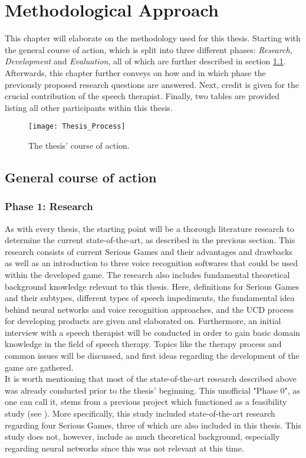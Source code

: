 \documentclass[draft,final]{vutinfth} %
\begin{document}
\chapter{Methodological Approach}
This chapter will elaborate on the methodology used for this thesis. Starting with the general course of action, which is split into three different phases: \emph{Research, Development} and \emph{Evaluation}, all of which are further described in section \ref{chap:coa}. Afterwards, this chapter further conveys on how and in which phase the previously proposed research questions are answered. Next, credit is given for the crucial contribution of the speech therapist. Finally, two tables are provided listing all other participants within this thesis.
\label{chap:methodoloy}
\begin{figure}
\begin{center}
\texttt{[image: Thesis\_Process]}
\end{center}
\caption{The thesis' course of action.}
\end{figure}

\section{General course of action}
\label{chap:coa}
\subsection{Phase 1: Research}
As with every thesis, the starting point will be a thorough literature research to determine the current state-of-the-art, as described in the previous section. This research consists of current Serious Games and their advantages and drawbacks as well as an introduction to three voice recognition softwares that could be used within the developed game. The research also includes fundamental theoretical background knowledge relevant to this thesis. Here, definitions for Serious Games and their subtypes, different types of speech impediments, the fundamental idea behind neural networks and voice recognition approaches, and the UCD process for developing products are given and elaborated on. Furthermore, an initial interview with a speech therapist will be conducted in order to gain basic domain knowledge in the field of speech therapy. Topics like the therapy process and common issues will be discussed, and first ideas regarding the development of the game are gathered. \\
It is worth mentioning that most of the state-of-the-art research described above was already conducted prior to the thesis' beginning. This unofficial "Phase 0", as one can call it, stems from a previous project which functioned as a feasibility study (see \cite{LEPaper}). More specifically, this study included state-of-the-art research regarding four Serious Games, three of which are also included in this thesis. This study does not, however, include as much theoretical background, especially regarding neural networks since this was not relevant at this time.
\end{document}
